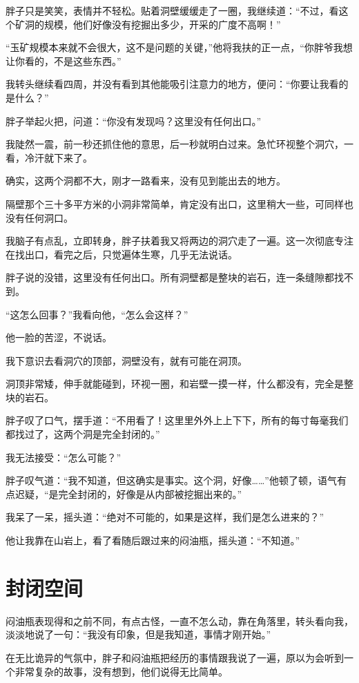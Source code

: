 胖子只是笑笑，表情并不轻松。贴着洞壁缓缓走了一圈，我继续道：“不过，看这个矿洞的规模，他们好像没有挖掘出多少，开采的广度不高啊！”

“玉矿规模本来就不会很大，这不是问题的关键，”他将我扶的正一点，“你胖爷我想让你看的，不是这些东西。”

我转头继续看四周，并没有看到其他能吸引注意力的地方，便问：“你要让我看的是什么？”

胖子举起火把，问道：“你没有发现吗？这里没有任何出口。”

我陡然一震，前一秒还抓住他的意思，后一秒就明白过来。急忙环视整个洞穴，一看，冷汗就下来了。

确实，这两个洞都不大，刚才一路看来，没有见到能出去的地方。

隔壁那个三十多平方米的小洞非常简单，肯定没有出口，这里稍大一些，可同样也没有任何洞口。

我脑子有点乱，立即转身，胖子扶着我又将两边的洞穴走了一遍。这一次彻底专注在找出口，看完之后，只觉遍体生寒，几乎无法说话。

胖子说的没错，这里没有任何出口。所有洞壁都是整块的岩石，连一条缝隙都找不到。

“这怎么回事？”我看向他，“怎么会这样？”

他一脸的苦涩，不说话。

我下意识去看洞穴的顶部，洞壁没有，就有可能在洞顶。

洞顶非常矮，伸手就能碰到，环视一圈，和岩壁一摸一样，什么都没有，完全是整块的岩石。

胖子叹了口气，摆手道：“不用看了！这里里外外上上下下，所有的每寸每毫我们都找过了，这两个洞是完全封闭的。”

我无法接受：“怎么可能？”

胖子叹气道：“我不知道，但这确实是事实。这个洞，好像……”他顿了顿，语气有点迟疑，“是完全封闭的，好像是从内部被挖掘出来的。”

我呆了一呆，摇头道：“绝对不可能的，如果是这样，我们是怎么进来的？”

他让我靠在山岩上，看了看随后跟过来的闷油瓶，摇头道：“不知道。”

\chapter{封闭空间}

闷油瓶表现得和之前不同，有点古怪，一直不怎么动，靠在角落里，转头看向我，淡淡地说了一句：“我没有印象，但是我知道，事情才刚开始。”

在无比诡异的气氛中，胖子和闷油瓶把经历的事情跟我说了一遍，原以为会听到一个非常复杂的故事，没有想到，他们说得无比简单。


